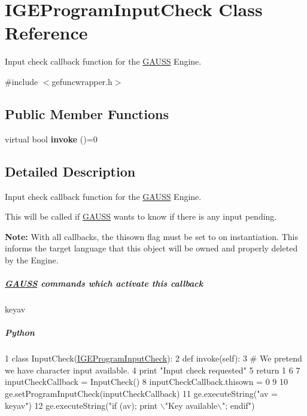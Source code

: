 \hypertarget{class_i_g_e_program_input_check}{\section{I\-G\-E\-Program\-Input\-Check Class Reference}
\label{class_i_g_e_program_input_check}
}


Input check callback function for the \hyperlink{class_g_a_u_s_s}{G\-A\-U\-S\-S} Engine.  




{\ttfamily \#include $<$gefuncwrapper.\-h$>$}

\subsection*{Public Member Functions}
\begin{DoxyCompactItemize}
\item 
\hypertarget{class_i_g_e_program_input_check_ad3353c3f7f7987d261fa17e717cc5eca}{virtual bool {\bfseries invoke} ()=0}\label{class_i_g_e_program_input_check_ad3353c3f7f7987d261fa17e717cc5eca}

\end{DoxyCompactItemize}


\subsection{Detailed Description}
Input check callback function for the \hyperlink{class_g_a_u_s_s}{G\-A\-U\-S\-S} Engine. 

This will be called if \hyperlink{class_g_a_u_s_s}{G\-A\-U\-S\-S} wants to know if there is any input pending.

{\bfseries Note\-:} With all callbacks, the {\ttfamily thisown} flag must be set to {} on instantiation. This informs the target language that this object will be owned and properly deleted by the Engine.

\subparagraph*{\hyperlink{class_g_a_u_s_s}{G\-A\-U\-S\-S} commands which activate this callback}


\begin{DoxyItemize}
\item {\ttfamily keyav}
\end{DoxyItemize}

\subparagraph*{Python}


\begin{DoxyCode}
1 \textcolor{keyword}{class }InputCheck(\hyperlink{class_i_g_e_program_input_check}{IGEProgramInputCheck}):
2     \textcolor{keyword}{def }invoke(self):
3         \textcolor{comment}{# We pretend we have character input available.}
4         \textcolor{keywordflow}{print} \textcolor{stringliteral}{"Input check requested"}
5         \textcolor{keywordflow}{return} 1
6 
7 inputCheckCallback = InputCheck()
8 inputCheckCallback.thisown = 0
9 
10 ge.setProgramInputCheck(inputCheckCallback)
11 ge.executeString(\textcolor{stringliteral}{"av = keyav"})
12 ge.executeString(\textcolor{stringliteral}{"if (av); print \(\backslash\)"Key available\(\backslash\)"; endif"})
\end{DoxyCode}


